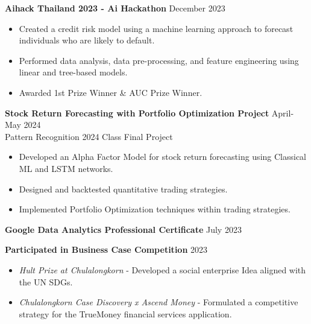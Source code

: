 \documentclass[11pt]{article}
\begin{document}
\textbf{Aihack Thailand 2023 - Ai Hackathon} \hfill December 2023
\begin{itemize}[noitemsep, topsep=0pt, partopsep=0pt, parsep=0pt]
    \item Created a credit risk model using a machine learning approach to forecast individuals who are likely to default.
    \item Performed data analysis, data pre-processing, and feature engineering using linear and tree-based models.
    \item Awarded 1st Prize Winner \& AUC Prize Winner.
\end{itemize}

\vspace{3pt}

\textbf{Stock Return Forecasting with Portfolio Optimization Project} \hfill April-May 2024 \\
{\footnotesize Pattern Recognition 2024 Class Final Project}
\begin{itemize}[noitemsep, topsep=0pt, partopsep=0pt, parsep=0pt]
    \item Developed an Alpha Factor Model for stock return forecasting using Classical ML and LSTM networks.
    \item Designed and backtested quantitative trading strategies.
    \item Implemented Portfolio Optimization techniques within trading strategies.
\end{itemize}

\vspace{3pt}

\textbf{Google Data Analytics Professional Certificate} \hfill July 2023

\vspace{3pt}

\textbf{Participated in Business Case Competition} \hfill 2023
\begin{itemize}[noitemsep, topsep=0pt, partopsep=0pt, parsep=0pt]
    \item \textit{Hult Prize at Chulalongkorn} - Developed a social enterprise Idea aligned with the UN SDGs.
    \item \textit{Chulalongkorn Case Discovery x Ascend Money} - Formulated a competitive strategy for the TrueMoney financial services application.
\end{itemize}


\end{document}
